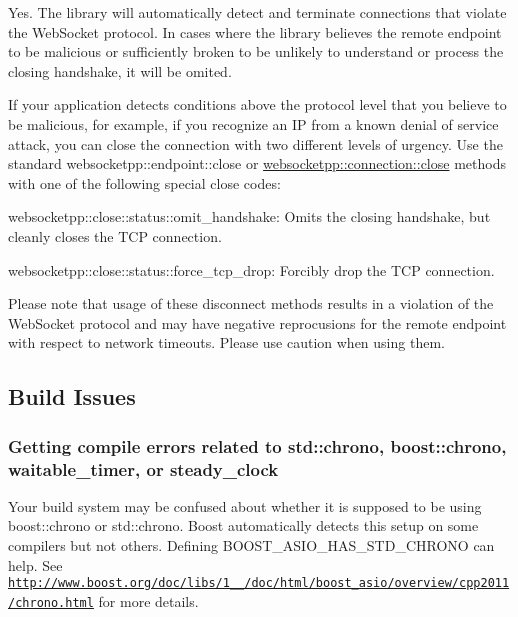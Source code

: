 Yes. The library will automatically detect and terminate connections that violate the Web\+Socket protocol. In cases where the library believes the remote endpoint to be malicious or sufficiently broken to be unlikely to understand or process the closing handshake, it will be omited.

If your application detects conditions above the protocol level that you believe to be malicious, for example, if you recognize an IP from a known denial of service attack, you can close the connection with two different levels of urgency. Use the standard {\ttfamily websocketpp\+::endpoint\+::close} or {\ttfamily \mbox{\hyperlink{classwebsocketpp_1_1connection_ae718e4fa8b2c37757d8abd71dae07dc9}{websocketpp\+::connection\+::close}}} methods with one of the following special close codes\+:
\begin{DoxyItemize}
\item {\ttfamily websocketpp\+::close\+::status\+::omit\+\_\+handshake}\+: Omits the closing handshake, but cleanly closes the T\+CP connection.
\item {\ttfamily websocketpp\+::close\+::status\+::force\+\_\+tcp\+\_\+drop}\+: Forcibly drop the T\+CP connection.
\end{DoxyItemize}

Please note that usage of these disconnect methods results in a violation of the Web\+Socket protocol and may have negative reprocusions for the remote endpoint with respect to network timeouts. Please use caution when using them.

\subsection*{Build Issues}

\subsubsection*{Getting compile errors related to {\ttfamily std\+::chrono}, {\ttfamily boost\+::chrono}, {\ttfamily waitable\+\_\+timer}, or {\ttfamily steady\+\_\+clock}}

Your build system may be confused about whether it is supposed to be using {\ttfamily boost\+::chrono} or {\ttfamily std\+::chrono}. Boost automatically detects this setup on some compilers but not others. Defining {\ttfamily B\+O\+O\+S\+T\+\_\+\+A\+S\+I\+O\+\_\+\+H\+A\+S\+\_\+\+S\+T\+D\+\_\+\+C\+H\+R\+O\+NO} can help. See \href{http://www.boost.org/doc/libs/1_60_0/doc/html/boost_asio/overview/cpp2011/chrono.html}{\tt http\+://www.\+boost.\+org/doc/libs/1\+\_\+\_/doc/html/boost\+\_\+asio/overview/cpp2011/chrono.\+html} for more details. 